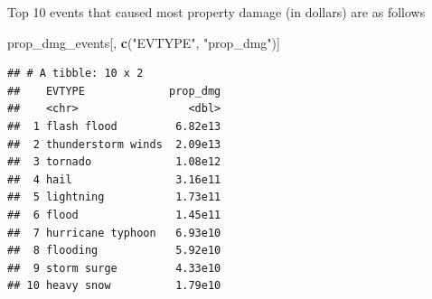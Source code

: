 \documentclass[]{article}
\newenvironment{Shaded}{\begin{snugshade}}{\end{snugshade}}
\newcommand{\KeywordTok}[1]{\textcolor[rgb]{0.13,0.29,0.53}{\textbf{#1}}}
\newcommand{\DataTypeTok}[1]{\textcolor[rgb]{0.13,0.29,0.53}{#1}}
\newcommand{\DecValTok}[1]{\textcolor[rgb]{0.00,0.00,0.81}{#1}}
\newcommand{\StringTok}[1]{\textcolor[rgb]{0.31,0.60,0.02}{#1}}
\newcommand{\CommentTok}[1]{\textcolor[rgb]{0.56,0.35,0.01}{\textit{#1}}}
\newcommand{\OperatorTok}[1]{\textcolor[rgb]{0.81,0.36,0.00}{\textbf{#1}}}
\newcommand{\NormalTok}[1]{#1}
\begin{document}
\begin{Shaded}
\end{Shaded}

Top 10 events that caused most property damage (in dollars) are as
follows

\begin{Shaded}
\begin{Highlighting}[]
\NormalTok{prop_dmg_events[, }\KeywordTok{c}\NormalTok{(}\StringTok{"EVTYPE"}\NormalTok{, }\StringTok{"prop_dmg"}\NormalTok{)]}
\end{Highlighting}
\end{Shaded}

\begin{verbatim}
## # A tibble: 10 x 2
##    EVTYPE             prop_dmg
##    <chr>                 <dbl>
##  1 flash flood         6.82e13
##  2 thunderstorm winds  2.09e13
##  3 tornado             1.08e12
##  4 hail                3.16e11
##  5 lightning           1.73e11
##  6 flood               1.45e11
##  7 hurricane typhoon   6.93e10
##  8 flooding            5.92e10
##  9 storm surge         4.33e10
## 10 heavy snow          1.79e10
\end{verbatim}
\end{document}
